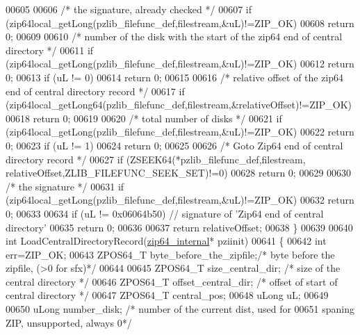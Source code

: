 \begin{DoxyCode}
00605 
00606   \textcolor{comment}{/* the signature, already checked */}
00607   \textcolor{keywordflow}{if} (zip64local\_getLong(pzlib\_filefunc\_def,filestream,&uL)!=ZIP\_OK)
00608     \textcolor{keywordflow}{return} 0;
00609 
00610   \textcolor{comment}{/* number of the disk with the start of the zip64 end of  central directory */}
00611   \textcolor{keywordflow}{if} (zip64local\_getLong(pzlib\_filefunc\_def,filestream,&uL)!=ZIP\_OK)
00612     \textcolor{keywordflow}{return} 0;
00613   \textcolor{keywordflow}{if} (uL != 0)
00614     \textcolor{keywordflow}{return} 0;
00615 
00616   \textcolor{comment}{/* relative offset of the zip64 end of central directory record */}
00617   \textcolor{keywordflow}{if} (zip64local\_getLong64(pzlib\_filefunc\_def,filestream,&relativeOffset)!=ZIP\_OK)
00618     \textcolor{keywordflow}{return} 0;
00619 
00620   \textcolor{comment}{/* total number of disks */}
00621   \textcolor{keywordflow}{if} (zip64local\_getLong(pzlib\_filefunc\_def,filestream,&uL)!=ZIP\_OK)
00622     \textcolor{keywordflow}{return} 0;
00623   \textcolor{keywordflow}{if} (uL != 1)
00624     \textcolor{keywordflow}{return} 0;
00625 
00626   \textcolor{comment}{/* Goto Zip64 end of central directory record */}
00627   \textcolor{keywordflow}{if} (ZSEEK64(*pzlib\_filefunc\_def,filestream, relativeOffset,ZLIB\_FILEFUNC\_SEEK\_SET)!=0)
00628     \textcolor{keywordflow}{return} 0;
00629 
00630   \textcolor{comment}{/* the signature */}
00631   \textcolor{keywordflow}{if} (zip64local\_getLong(pzlib\_filefunc\_def,filestream,&uL)!=ZIP\_OK)
00632     \textcolor{keywordflow}{return} 0;
00633 
00634   \textcolor{keywordflow}{if} (uL != 0x06064b50) \textcolor{comment}{// signature of 'Zip64 end of central directory'}
00635     \textcolor{keywordflow}{return} 0;
00636 
00637   \textcolor{keywordflow}{return} relativeOffset;
00638 \}
00639 
00640 \textcolor{keywordtype}{int} LoadCentralDirectoryRecord(\hyperlink{structzip64__internal}{zip64\_internal}* pziinit)
00641 \{
00642   \textcolor{keywordtype}{int} err=ZIP\_OK;
00643   ZPOS64\_T byte\_before\_the\_zipfile;\textcolor{comment}{/* byte before the zipfile, (>0 for sfx)*/}
00644 
00645   ZPOS64\_T size\_central\_dir;     \textcolor{comment}{/* size of the central directory  */}
00646   ZPOS64\_T offset\_central\_dir;   \textcolor{comment}{/* offset of start of central directory */}
00647   ZPOS64\_T central\_pos;
00648   uLong uL;
00649 
00650   uLong number\_disk;          \textcolor{comment}{/* number of the current dist, used for}
00651 \textcolor{comment}{                              spaning ZIP, unsupported, always 0*/}

\end{DoxyCode}
